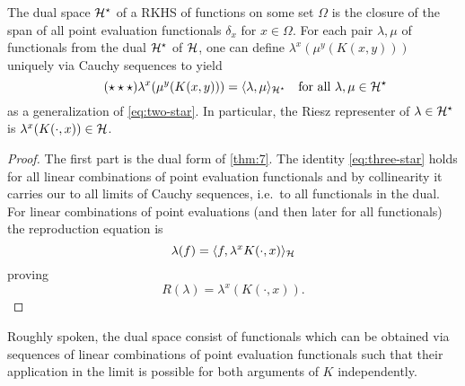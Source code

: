 \documentclass[../skript.tex]{subfiles}
\begin{document}
\begin{theorem} %
\label{thm:10}
The dual space $\mathcal{H}^\star$ of a \ac{RKHS} of functions on some set $\Omega$ is the closure of the span of all point evaluation functionals $\delta_x$ for $x \in \Omega$.
For each pair $\lambda, \mu$ of functionals from the dual $\mathcal{H}^\star$ of $\mathcal{H}$, one can define $\lambda^x(\mu^y(K(x, y)))$ uniquely via Cauchy sequences to yield
\begin{equation}
\label{eq:three-star}
\tag{$\star\star\star$}
	\lambda^x(\mu^y(K(x, y))) = \langle \lambda, \mu \rangle_{\mathcal{H}^\star} \quad \text{for all } \lambda, \mu \in \mathcal{H}^\star
\end{equation}
as a generalization of \cref{eq:two-star}.
In particular, the Riesz representer of $\lambda \in \mathcal{H}^\star$ is $\lambda^x(K(\cdot, x)) \in \mathcal{H}$.
\end{theorem}
\begin{proof}
The first part is the dual form of \cref{thm:7}.
The identity \cref{eq:three-star} holds for all linear combinations of point evaluation functionals and by collinearity it carries our to all limits of Cauchy sequences, i.e.\ to all functionals in the dual.
For linear combinations of point evaluations (and then later for all functionals) the reproduction equation is
\[
	\lambda(f) = \langle f, \lambda^x K(\cdot, x) \rangle_{\mathcal{H}}
\]
proving
\[
	R(\lambda) = \lambda^x(K(\cdot, x)).
\]
\end{proof}
Roughly spoken, the dual space consist of functionals which can be obtained via sequences of linear combinations of point evaluation functionals such that their application in the limit is possible for both arguments of $K$ independently.
\end{document}
